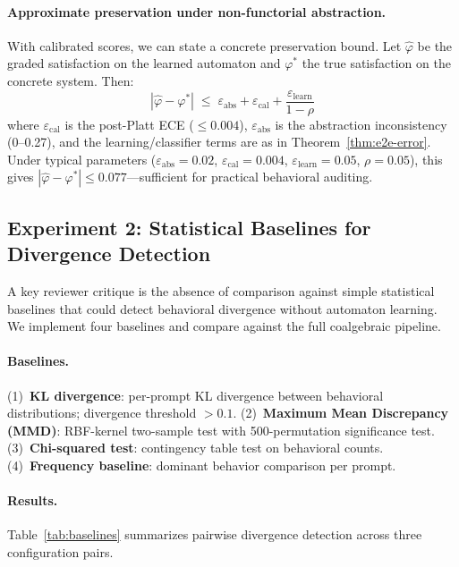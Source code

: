 \documentclass[11pt]{article}
\begin{document}
\paragraph{Approximate preservation under non-functorial abstraction.}
With calibrated scores, we can state a concrete preservation bound.
Let $\hat{\varphi}$ be the graded satisfaction on the learned
automaton and $\varphi^*$ the true satisfaction on the concrete
system.  Then:
\begin{equation}\label{eq:approx-preservation}
  |\hat{\varphi} - \varphi^*| \;\le\;
  \varepsilon_{\mathrm{abs}} + \varepsilon_{\mathrm{cal}}
  + \frac{\varepsilon_{\mathrm{learn}}}{1 - \rho}
\end{equation}
where $\varepsilon_{\mathrm{cal}}$ is the post-Platt ECE (${\le}0.004$),
$\varepsilon_{\mathrm{abs}}$ is the abstraction inconsistency
(0--0.27), and the learning/classifier terms are as in
Theorem~\ref{thm:e2e-error}.  Under typical parameters
($\varepsilon_{\mathrm{abs}}{=}0.02$, $\varepsilon_{\mathrm{cal}}{=}0.004$,
$\varepsilon_{\mathrm{learn}}{=}0.05$, $\rho{=}0.05$), this gives
$|\hat{\varphi} - \varphi^*| \le 0.077$---sufficient for practical
behavioral auditing.

\subsection{Experiment 2: Statistical Baselines for Divergence Detection}\label{sec:stat-baselines}

A key reviewer critique is the absence of comparison against simple
statistical baselines that could detect behavioral divergence without
automaton learning.  We implement four baselines and compare against
the full coalgebraic pipeline.

\paragraph{Baselines.}
(1)~\textbf{KL divergence}: per-prompt KL divergence between behavioral
distributions; divergence threshold $>0.1$.
(2)~\textbf{Maximum Mean Discrepancy (MMD)}: RBF-kernel two-sample test
with 500-permutation significance test.
(3)~\textbf{Chi-squared test}: contingency table test on behavioral counts.
(4)~\textbf{Frequency baseline}: dominant behavior comparison per prompt.

\paragraph{Results.}
Table~\ref{tab:baselines} summarizes pairwise divergence detection
across three configuration pairs.
\end{document}

